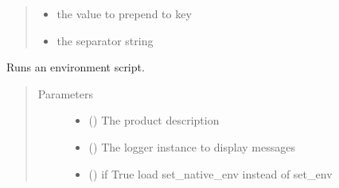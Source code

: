\documentclass[a4paper,10pt,english]{sphinxmanual}
\begin{document}
\begin{fulllineitems}
\begin{fulllineitems}
\begin{quote}
\begin{description}
\begin{itemize}
\item {} 
 \textendash{} the value to prepend to key

\item {} 
 \textendash{} the separator string

\end{itemize}

\end{description}\end{quote}

\end{fulllineitems}


\begin{fulllineitems}
\label{\detokenize{commands/apidoc/src:src.environment.SalomeEnviron.run_env_script}}
Runs an environment script.
\begin{quote}\begin{description}
\item[{Parameters}] \leavevmode\begin{itemize}
\item {} 
 () \textendash{} The product description

\item {} 
 () \textendash{} The logger instance to display messages

\item {} 
 () \textendash{} if True load set\_native\_env instead of set\_env

\end{itemize}

\end{description}\end{quote}

\end{fulllineitems}



\end{fulllineitems}
\end{document}

